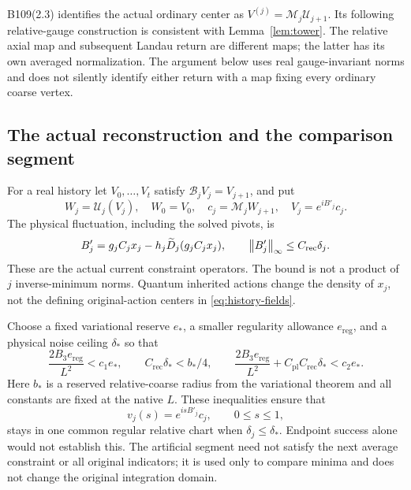 B109(2.3) identifies the actual ordinary center as $V^{(j)}=\mathcal M_j\mathcal U_{j+1}$. Its following relative-gauge construction is consistent with Lemma~\ref{lem:tower}. The relative axial map and subsequent Landau return are different maps; the latter has its own averaged normalization. The argument below uses real gauge-invariant norms and does not silently identify either return with a map fixing every ordinary coarse vertex.

\subsection{The actual reconstruction and the comparison segment}

For a real history let $V_0,\ldots,V_t$ satisfy $\mathcal B_jV_j=V_{j+1}$, and put
\begin{equation}\label{eq:history-fields}
 W_j=\mathcal U_j(V_j),\quad W_0=V_0,\quad
 c_j=\mathcal M_jW_{j+1},\quad V_j=e^{iB'_j}c_j.
\end{equation}
The physical fluctuation, including the solved pivots, is
\begin{equation}\label{eq:prefix-noise}
 B'_j=g_jC_jx_j-h_j\widetilde D_j(g_jC_jx_j),\qquad
 \left\lVert B'_j\right\rVert_\infty\le C_{\mathrm{rec}}\delta_j.
\end{equation}
These are the actual current constraint operators. The bound is not a product of $j$ inverse-minimum norms. Quantum inherited actions change the density of $x_j$, not the defining original-action centers in \eqref{eq:history-fields}.

Choose a fixed variational reserve $e_*$, a smaller regularity allowance $e_{\mathrm{reg}}$, and a physical noise ceiling $\delta_*$ so that
\begin{equation}\label{eq:segment-margins}
 \frac{2B_3e_{\mathrm{reg}}}{L^2}<c_1e_*,\qquad
 C_{\mathrm{rec}}\delta_*<b_*/4,\qquad
 \frac{2B_3e_{\mathrm{reg}}}{L^2}+C_{\mathrm{pl}}C_{\mathrm{rec}}\delta_*<c_2e_*.
\end{equation}
Here $b_*$ is a reserved relative-coarse radius from the variational theorem and all constants are fixed at the native $L$. These inequalities ensure that
\begin{equation}\label{eq:comparison-segment}
 v_j(s)=e^{isB'_j}c_j,\qquad0\le s\le1,
\end{equation}
stays in one common regular relative chart when $\delta_j\le\delta_*$. Endpoint success alone would not establish this. The artificial segment need not satisfy the next average constraint or all original indicators; it is used only to compare minima and does not change the original integration domain.

